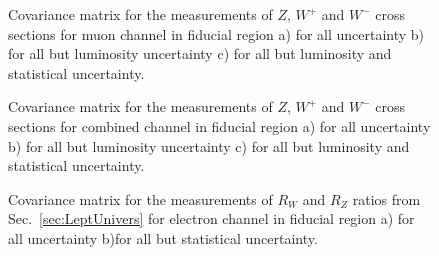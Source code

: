 \begin{figure}[!h]
\begin{minipage}[h]{0.32\linewidth}
\end{minipage}
\hfill
\begin{minipage}[h]{0.32\linewidth}
\end{minipage}
\hfill
\begin{minipage}[h]{0.32\linewidth}
\end{minipage}
\caption{Covariance matrix for the measurements of $Z$, $W^+$ and $W^{-}$  cross sections for muon channel in fiducial region a) for all uncertainty b) for all but luminosity uncertainty c) for all but luminosity and statistical uncertainty. }
\label{fig:AppCMu}
\end{figure}


\begin{figure}[!h]
\begin{minipage}[h]{0.32\linewidth}
\end{minipage}
\hfill
\begin{minipage}[h]{0.32\linewidth}
\end{minipage}
\hfill
\begin{minipage}[h]{0.32\linewidth}
\end{minipage}
\caption{Covariance matrix for the measurements of $Z$, $W^+$ and $W^{-}$  cross sections for combined channel in fiducial region a) for all uncertainty b) for all but luminosity uncertainty c) for all but luminosity and statistical uncertainty. }
\label{fig:AppCComb}
\end{figure}

\begin{figure}[!h]
\begin{minipage}[h]{0.49\linewidth}
\end{minipage}
\hfill
\begin{minipage}[h]{0.49\linewidth}
\end{minipage}
\caption{Covariance matrix for the measurements of $R_{W}$ and $R_{Z}$  ratios from Sec.~\ref{sec:LeptUnivers} for electron channel in fiducial region a) for all uncertainty b)for all but statistical uncertainty. }
\label{fig:AppCR}
\end{figure}
